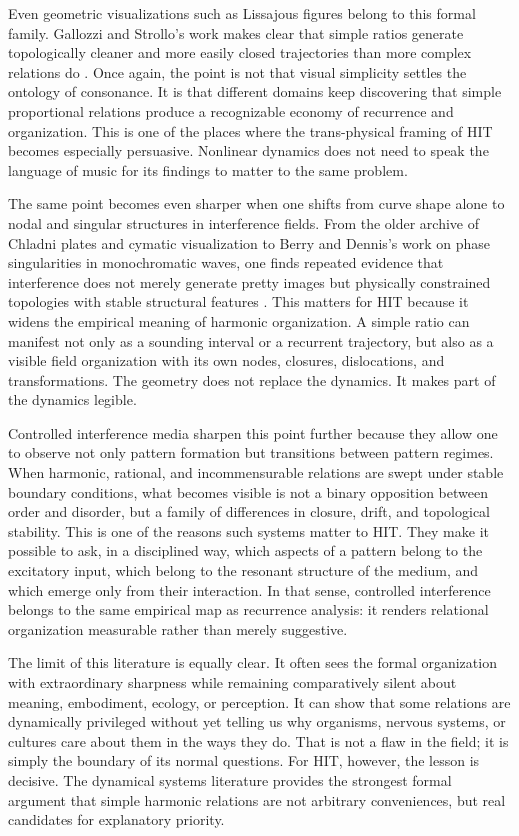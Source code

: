 Even geometric visualizations such as Lissajous figures belong to this formal family. Gallozzi and Strollo's work makes clear that simple ratios generate topologically cleaner and more easily closed trajectories than more complex relations do \parencite{gallozzi_2023}. Once again, the point is not that visual simplicity settles the ontology of consonance. It is that different domains keep discovering that simple proportional relations produce a recognizable economy of recurrence and organization. This is one of the places where the trans-physical framing of HIT becomes especially persuasive. Nonlinear dynamics does not need to speak the language of music for its findings to matter to the same problem.

The same point becomes even sharper when one shifts from curve shape alone to nodal and singular structures in interference fields. From the older archive of Chladni plates and cymatic visualization to Berry and Dennis's work on phase singularities in monochromatic waves, one finds repeated evidence that interference does not merely generate pretty images but physically constrained topologies with stable structural features \parencite{berry_2001}. This matters for HIT because it widens the empirical meaning of harmonic organization. A simple ratio can manifest not only as a sounding interval or a recurrent trajectory, but also as a visible field organization with its own nodes, closures, dislocations, and transformations. The geometry does not replace the dynamics. It makes part of the dynamics legible.

Controlled interference media sharpen this point further because they allow one to observe not only pattern formation but transitions between pattern regimes. When harmonic, rational, and incommensurable relations are swept under stable boundary conditions, what becomes visible is not a binary opposition between order and disorder, but a family of differences in closure, drift, and topological stability. This is one of the reasons such systems matter to HIT. They make it possible to ask, in a disciplined way, which aspects of a pattern belong to the excitatory input, which belong to the resonant structure of the medium, and which emerge only from their interaction. In that sense, controlled interference belongs to the same empirical map as recurrence analysis: it renders relational organization measurable rather than merely suggestive.

The limit of this literature is equally clear. It often sees the formal organization with extraordinary sharpness while remaining comparatively silent about meaning, embodiment, ecology, or perception. It can show that some relations are dynamically privileged without yet telling us why organisms, nervous systems, or cultures care about them in the ways they do. That is not a flaw in the field; it is simply the boundary of its normal questions. For HIT, however, the lesson is decisive. The dynamical systems literature provides the strongest formal argument that simple harmonic relations are not arbitrary conveniences, but real candidates for explanatory priority.

